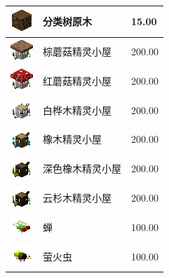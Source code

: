 \documentclass[UTF8]{ctexart}
\begin{document}
\begin{longtable}[]{|p{1cm}|p{8cm}|p{1.5cm}|}
	\hline
	\includegraphics{.workspace/icons/twilightforest/twilightforest__magic_log__3.png} & 分类树原木 &15.00\\
	\hline
	\includegraphics{.workspace/icons/iceandfire/iceandfire__pixie_house__0.png} & 棕蘑菇精灵小屋 &200.00\\
	\hline
	\includegraphics{.workspace/icons/iceandfire/iceandfire__pixie_house__1.png} & 红蘑菇精灵小屋 &200.00\\
	\hline
	\includegraphics{.workspace/icons/iceandfire/iceandfire__pixie_house__2.png} & 白桦木精灵小屋 &200.00\\
	\hline
	\includegraphics{.workspace/icons/iceandfire/iceandfire__pixie_house__3.png} & 橡木精灵小屋 &200.00\\
	\hline
	\includegraphics{.workspace/icons/iceandfire/iceandfire__pixie_house__4.png} & 深色橡木精灵小屋 &200.00\\
	\hline
	\includegraphics{.workspace/icons/iceandfire/iceandfire__pixie_house__5.png} & 云杉木精灵小屋 &200.00\\
	\hline
	\includegraphics{.workspace/icons/twilightforest/twilightforest__cicada__0.png} & 蝉 &100.00\\
	\hline
	\includegraphics{.workspace/icons/twilightforest/twilightforest__firefly__0.png} & 萤火虫 &100.00\\

\end{longtable}
\end{document}
